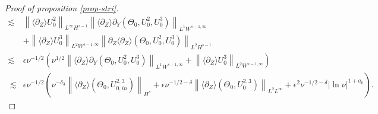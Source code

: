 \documentclass[12pt]{article}
\def\d{\mathrm{d}}
\newcommand{\wtb}{\langle\partial_Z\rangle }
\newcommand{\nm}[2]{\left\| #1 \right\| _{#2} }
\numberwithin{equation}{section}
\begin{document}
\begin{proof}[Proof of proposition \ref{prop-stri}]
\begin{align*}
		\lesssim & \nm{\wtb U_0^2}{L^{\infty} H^{s-1}} \nm{\wtb \partial_Y (\Theta_0, U_0^2,U_0^3)}{L^1 W^{s-1,\infty}}\\
		& + \nm{\wtb U_0^3}{L^2 W^{s-1,\infty}} \nm{\partial_Z\wtb (\Theta_0, U_0^2,U_0^3)}{L^{2} H^{s-1}  } \\    
		\lesssim & \epsilon \nu^{-1/2} \left( \nu^{1/2} \nm{\wtb \partial_Y (\Theta_0, U_0^2,U_0^3)}{L^1 W^{s-1,\infty}} + \nm{\wtb U_0^3}{L^2 W^{s-1,\infty}}  \right) \\ 
		~\lesssim & \epsilon \nu^{-1/2} \left( \nu ^{-\delta_3} \left \| \wtb (\Theta_0,  U_{0,in}^{2,3})  \right \| _{H^s}+ \epsilon \nu^{-1/2-\delta} \nm{ \wtb (\Theta_0, U_0^{2,3})}{L^{2} L^{\infty}} +\epsilon^2 \nu^{-1/2-\delta} | \ln{\nu} |^{1+a_0} \right).  
	\end{align*}
	

\end{proof}
\end{document}
